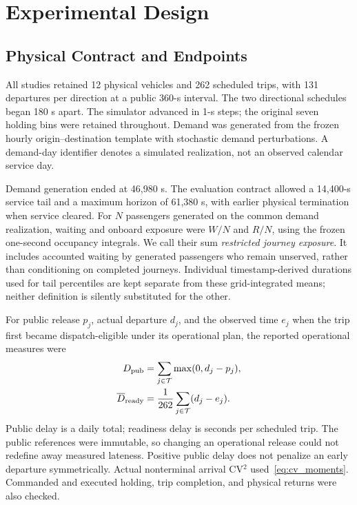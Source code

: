 \section{Experimental Design}
\label{sec:experiments}
\subsection{Physical Contract and Endpoints}
All studies retained 12 physical vehicles and 262 scheduled trips, with 131 departures per direction at a public 360-s interval. The two directional schedules began 180 s apart. The simulator advanced in 1-s steps; the original seven holding bins were retained throughout. Demand was generated from the frozen hourly origin--destination template with stochastic demand perturbations. A demand-day identifier denotes a simulated realization, not an observed calendar service day.

Demand generation ended at 46,980 s. The evaluation contract allowed a 14,400-s service tail and a maximum horizon of 61,380 s, with earlier physical termination when service cleared. For $N$ passengers generated on the common demand realization, waiting and onboard exposure were $W/N$ and $R/N$, using the frozen one-second occupancy integrals. We call their sum \emph{restricted journey exposure}. It includes accounted waiting by generated passengers who remain unserved, rather than conditioning on completed journeys. Individual timestamp-derived durations used for tail percentiles are kept separate from these grid-integrated means; neither definition is silently substituted for the other.

For public release $p_j$, actual departure $d_j$, and the observed time $e_j$ when the trip first became dispatch-eligible under its operational plan, the reported operational measures were
\begin{align}
 D_{\rm pub}&=\sum_{j\in\mathcal T}\max(0,d_j-p_j),\\
 \overline D_{\rm ready}&=\frac{1}{262}\sum_{j\in\mathcal T}(d_j-e_j).
\end{align}
Public delay is a daily total; readiness delay is seconds per scheduled trip. The public references were immutable, so changing an operational release could not redefine away measured lateness. Positive public delay does not penalize an early departure symmetrically. Actual nonterminal arrival CV$^2$ used~\eqref{eq:cv_moments}. Commanded and executed holding, trip completion, and physical returns were also checked.

